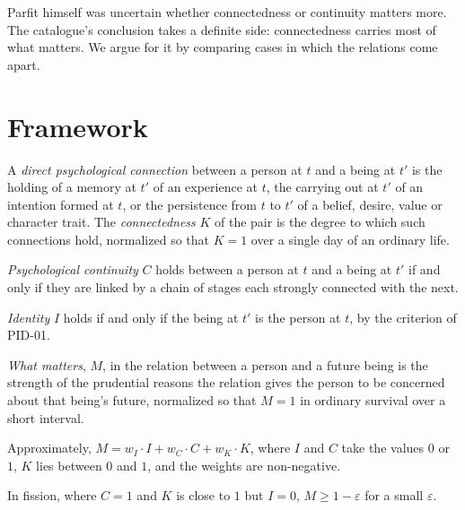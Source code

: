 \documentclass{situationist-preprint}
\begin{document}
Parfit himself was uncertain whether connectedness or continuity matters more. The catalogue's conclusion takes a definite side: connectedness carries most of what matters. We argue for it by comparing cases in which the relations come apart.

\section{Framework}\label{s:frame}

\begin{definition}\label{d:conn}
A \emph{direct psychological connection} between a person at $t$ and a being at $t'$ is the holding of a memory at $t'$ of an experience at $t$, the carrying out at $t'$ of an intention formed at $t$, or the persistence from $t$ to $t'$ of a belief, desire, value or character trait. The \emph{connectedness} $K$ of the pair is the degree to which such connections hold, normalized so that $K=1$ over a single day of an ordinary life.
\end{definition}

\begin{definition}\label{d:cont}
\emph{Psychological continuity} $C$ holds between a person at $t$ and a being at $t'$ if and only if they are linked by a chain of stages each strongly connected with the next.
\end{definition}

\begin{definition}\label{d:id}
\emph{Identity} $I$ holds if and only if the being at $t'$ is the person at $t$, by the criterion of PID-01.
\end{definition}

\begin{definition}\label{d:m}
\emph{What matters}, $M$, in the relation between a person and a future being is the strength of the prudential reasons the relation gives the person to be concerned about that being's future, normalized so that $M=1$ in ordinary survival over a short interval.
\end{definition}

\begin{assumption}\label{a:add}
Approximately, $M = w_I \cdot I + w_C \cdot C + w_K \cdot K$, where $I$ and $C$ take the values $0$ or $1$, $K$ lies between $0$ and $1$, and the weights are non-negative.
\end{assumption}

\begin{principle}[Fission]\label{p:fission}
In fission, where $C=1$ and $K$ is close to $1$ but $I=0$, $M \geq 1-\varepsilon$ for a small $\varepsilon$.
\end{principle}
\end{document}
